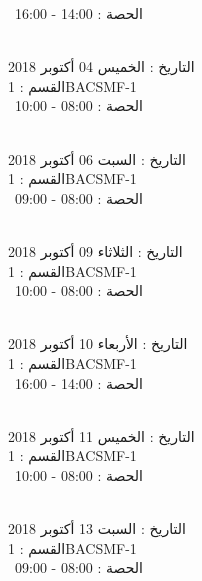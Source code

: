  \  
الحصة : 14:00 - 16:00 \\
\par
\noindent\makebox[\linewidth]{\rule{\paperwidth}{0.4pt}}
 \\
التاريخ : الخميس 04 أكتوبر 2018 \\
القسم : 1BACSMF-1 \\
 \  
الحصة : 08:00 - 10:00 \\
\par
\noindent\makebox[\linewidth]{\rule{\paperwidth}{0.4pt}}
 \\
التاريخ : السبت 06 أكتوبر 2018 \\
القسم : 1BACSMF-1 \\
 \  
الحصة : 08:00 - 09:00 \\
\par
\noindent\makebox[\linewidth]{\rule{\paperwidth}{0.4pt}}
 \\
التاريخ : الثلاثاء 09 أكتوبر 2018 \\
القسم : 1BACSMF-1 \\
 \  
الحصة : 08:00 - 10:00 \\
\par
\noindent\makebox[\linewidth]{\rule{\paperwidth}{0.4pt}}
 \\
التاريخ : الأربعاء 10 أكتوبر 2018 \\
القسم : 1BACSMF-1 \\
 \  
الحصة : 14:00 - 16:00 \\
\par
\noindent\makebox[\linewidth]{\rule{\paperwidth}{0.4pt}}
 \\
التاريخ : الخميس 11 أكتوبر 2018 \\
القسم : 1BACSMF-1 \\
 \  
الحصة : 08:00 - 10:00 \\
\par
\noindent\makebox[\linewidth]{\rule{\paperwidth}{0.4pt}}
 \\
التاريخ : السبت 13 أكتوبر 2018 \\
القسم : 1BACSMF-1 \\
 \  
الحصة : 08:00 - 09:00 \\
\par
\noindent\makebox[\linewidth]{\rule{\paperwidth}{0.4pt}}
 \\
